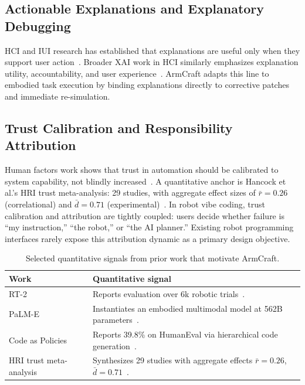 \documentclass[sigconf,review,anonymous]{acmart}
\begin{document}
\subsection{Actionable Explanations and Explanatory Debugging}
HCI and IUI research has established that explanations are useful only when they support user action~\cite{kulesza2015principles,kulesza2013too}. Broader XAI work in HCI similarly emphasizes explanation utility, accountability, and user experience~\cite{abdul2018trends,liao2020questioning}. ArmCraft adapts this line to embodied task execution by binding explanations directly to corrective patches and immediate re-simulation.

\subsection{Trust Calibration and Responsibility Attribution}
Human factors work shows that trust in automation should be calibrated to system capability, not blindly increased~\cite{lee2004trust,parasuraman1997humans,hancock2011meta}. A quantitative anchor is Hancock et al.'s HRI trust meta-analysis: 29 studies, with aggregate effect sizes of $\bar{r}=0.26$ (correlational) and $\bar{d}=0.71$ (experimental)~\cite{hancock2011meta}. In robot vibe coding, trust calibration and attribution are tightly coupled: users decide whether failure is ``my instruction,'' ``the robot,'' or ``the AI planner.'' Existing robot programming interfaces rarely expose this attribution dynamic as a primary design objective.

\begin{table}[t]
  \caption{Selected quantitative signals from prior work that motivate ArmCraft.}
  \label{tab:prior-quant}
  \begin{tabular}{p{2.0cm}p{5.0cm}}
    \toprule
    Work & Quantitative signal \\
    \midrule
    RT-2 & Reports evaluation over 6k robotic trials~\cite{brohan2023rt2}. \\
    PaLM-E & Instantiates an embodied multimodal model at 562B parameters~\cite{driess2023palme}. \\
    Code as Policies & Reports 39.8\% on HumanEval via hierarchical code generation~\cite{liang2023codeaspolicies}. \\
    HRI trust meta-analysis & Synthesizes 29 studies with aggregate effects $\bar{r}=0.26$, $\bar{d}=0.71$~\cite{hancock2011meta}. \\
    \bottomrule
  \end{tabular}
\end{table}
\end{document}

